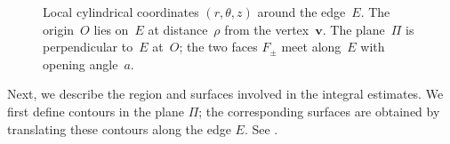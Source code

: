 ﻿\documentclass[11pt,reqno,oneside]{amsart}
\theoremstyle{definition}
\theoremstyle{remark}
\begin{document}
\begin{figure}[ht]
            \caption{Local cylindrical coordinates $(r,\theta,z)$ around the edge~$E$.
            The origin~$O$ lies on~$E$ at distance~$\rho$ from the vertex~$\mathbf{v}$.
            The plane~$\Pi$ is perpendicular to~$E$ at~$O$;
            the two faces $F_\pm$ meet along~$E$ with opening angle~$a$.}
            \label{fig:local-cylindrical}
        \end{figure}

        Next, we describe the region and surfaces involved in the integral estimates. We first define contours in the plane $\Pi$; the corresponding surfaces are obtained by translating these contours along the edge $E$. See .
\end{document}
